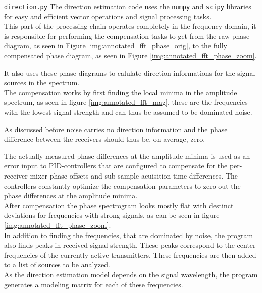 \begin{subchapter}{\texttt{direction.py}}
  The direction estimation code uses the \texttt{numpy} and
  \texttt{scipy} libraries for easy and efficient
  vector operations and signal processing tasks. \\

  This part of the processing chain operates completely
  in the frequency domain, it is responsible for
  performing the compensation tasks to get from the
  raw phase diagram, as seen in Figure \ref{img:annotated_fft_phase_orig},
  to the fully compensated phase diagram,
  as seen in Figure \ref{img:annotated_fft_phase_zoom}.

  It also uses these phase diagrams to calulate direction informations
  for the signal sources in the spectrum. \\

  The compensation works by first finding the local minima in
  the amplitude spectrum, as seen in figure \ref{img:annotated_fft_mag},
  these are the frequencies with the lowest signal strength
  and can thus be assumed to be dominated noise.

  As discussed before noise carries no direction
  information and the phase difference between the
  receivers should thus be, on average, zero.

  The actually measured phase differences at the amplitude minima
  is used as an error input to PID-controllers that
  are configured to compensate for the per-receiver
  mixer phase offsets and sub-sample acuisition
  time differences.
  The controllers constantly optimize the compensation
  parameters to zero out the phase differences at the
  amplitude minima. \\

  After compensation the phase spectrogram looks mostly
  flat with destinct deviations for frequencies
  with strong signals, as can be seen in
  figure \ref{img:annotated_fft_phase_zoom}. \\

  In addition to finding the frequencies, that are dominated
  by noise, the program also finds peaks in received signal strength.
  These peaks correspond to the center frequencies of the currently active
  transmitters.
  These frequencies are then added to a list of sources to be
  analyzed. \\

  As the direction estimation model depends on the
  signal wavelength, the program generates a modeling matrix
  for each of these frequencies. \\


\end{subchapter}
